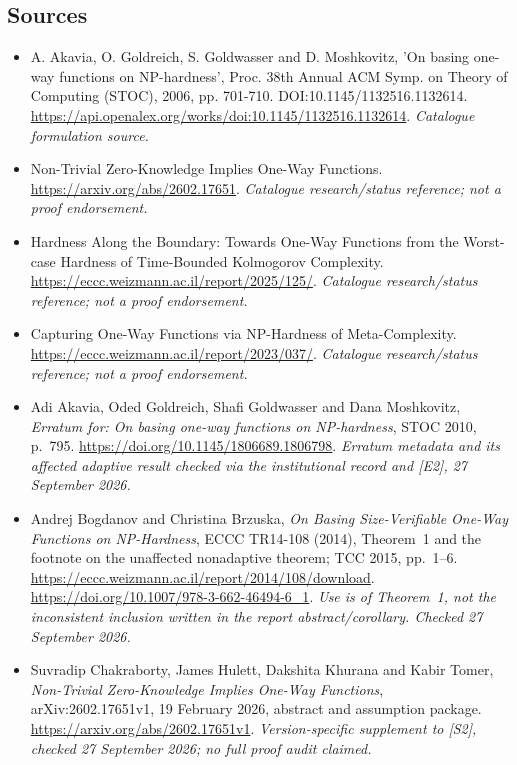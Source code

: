\documentclass[11pt,a4paper]{article}
\numberwithin{equation}{section}
\begin{document}
\subsection{Sources}
\begin{itemize}\raggedright
\item[\textnormal{[S1]}]\hypertarget{source:33:1}{} A. Akavia, O. Goldreich, S. Goldwasser and D. Moshkovitz, 'On basing one-way functions on NP-hardness', Proc. 38th Annual ACM Symp. on Theory of Computing (STOC), 2006, pp. 701-710. DOI:10.1145/1132516.1132614.
\url{https://api.openalex.org/works/doi:10.1145/1132516.1132614}.
{\small\textit{Catalogue formulation source.}}
\item[\textnormal{[S2]}]\hypertarget{source:33:2}{} Non-Trivial Zero-Knowledge Implies One-Way Functions.
\url{https://arxiv.org/abs/2602.17651}.
{\small\textit{Catalogue research/status reference; not a proof endorsement.}}
\item[\textnormal{[S3]}]\hypertarget{source:33:3}{} Hardness Along the Boundary: Towards One-Way Functions from the Worst-case Hardness of Time-Bounded Kolmogorov Complexity.
\url{https://eccc.weizmann.ac.il/report/2025/125/}.
{\small\textit{Catalogue research/status reference; not a proof endorsement.}}
\item[\textnormal{[S4]}]\hypertarget{source:33:4}{} Capturing One-Way Functions via NP-Hardness of Meta-Complexity.
\url{https://eccc.weizmann.ac.il/report/2023/037/}.
{\small\textit{Catalogue research/status reference; not a proof endorsement.}}
\item[\textnormal{[E1]}]\hypertarget{extra:33:1}{} Adi Akavia, Oded
Goldreich, Shafi Goldwasser and Dana Moshkovitz, \emph{Erratum for: On
basing one-way functions on NP-hardness}, STOC 2010, p.~795.
\url{https://doi.org/10.1145/1806689.1806798}.
{\small\textit{Erratum metadata and its affected adaptive result checked
via the institutional record and [E2], 27 September 2026.}}
\item[\textnormal{[E2]}]\hypertarget{extra:33:2}{} Andrej Bogdanov and
Christina Brzuska, \emph{On Basing Size-Verifiable One-Way Functions on
NP-Hardness}, ECCC TR14-108 (2014), Theorem~1 and the footnote on the
unaffected nonadaptive theorem; TCC 2015, pp.~1--6.
\url{https://eccc.weizmann.ac.il/report/2014/108/download}.
\url{https://doi.org/10.1007/978-3-662-46494-6_1}.
{\small\textit{Use is of Theorem~1, not the inconsistent inclusion written
in the report abstract/corollary. Checked 27 September 2026.}}
\item[\textnormal{[E3]}]\hypertarget{extra:33:3}{} Suvradip Chakraborty,
James Hulett, Dakshita Khurana and Kabir Tomer, \emph{Non-Trivial
Zero-Knowledge Implies One-Way Functions}, arXiv:2602.17651v1,
19 February 2026, abstract and assumption package.
\url{https://arxiv.org/abs/2602.17651v1}.
{\small\textit{Version-specific supplement to [S2], checked
27 September 2026; no full proof audit claimed.}}

\end{itemize}

\end{document}
